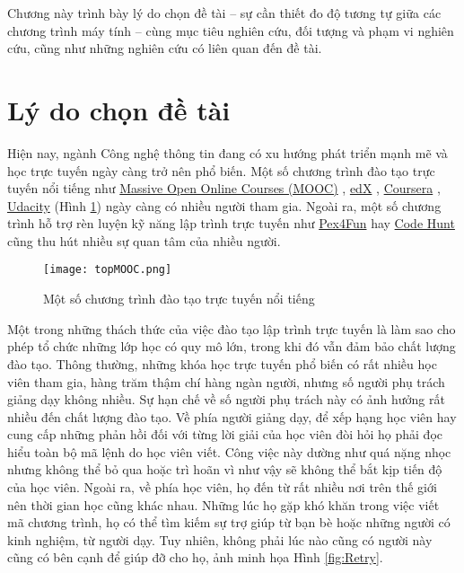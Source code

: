 Chương này trình bày lý do chọn đề tài -- sự cần thiết đo độ tương tự
giữa các chương trình máy tính -- cùng mục tiêu nghiên cứu, đối tượng và phạm
vi nghiên cứu, cũng như những nghiên cứu có liên quan đến đề tài.

\section{Lý do chọn đề tài}

Hiện nay, ngành Công nghệ thông tin đang có xu hướng phát triển mạnh
mẽ và học trực tuyến ngày càng trở nên phổ biến. Một số chương trình
đào tạo trực tuyến nổi tiếng như
\href{https://www.coursera.org/course/saas}{Massive Open Online
  Courses (MOOC)} \cite{mooc}, \href{https://www.edx.org/}{edX}
\cite{edx}, \href{https://www.coursera.org/}{Coursera}
\cite{coursera}, \href{http://www.udacity.com/}{Udacity}
\cite{Udacity} (Hình \ref{fig:progarming-online}) ngày càng có nhiều người tham gia. Ngoài ra, một số
chương trình hỗ trợ rèn luyện kỹ năng lập trình trực tuyến như
\href{https://www.pexforfun.com/}{Pex4Fun} \cite{Pex4Fun} hay
\href{https://www.microsoft.com/en-us/research/project/code-hunt/}{Code
  Hunt} \cite{CodeHunt} cũng thu hút nhiều sự quan tâm của nhiều
người. 

\begin{figure}[h]
	\centering
	\texttt{[image: topMOOC.png]}
	\caption{Một số chương trình đào tạo trực tuyến nổi tiếng}
	\label{fig:progarming-online}		
\end{figure}

Một trong những thách thức của việc đào tạo lập trình trực tuyến là
làm sao cho phép tổ chức những lớp học có quy mô lớn, trong khi đó vẫn
đảm bảo chất lượng đào tạo. Thông thường, những khóa học trực tuyến
phổ biến có rất nhiều học viên tham gia, hàng trăm thậm chí hàng ngàn
người, nhưng số người phụ trách giảng dạy không nhiều. Sự hạn chế về
số người phụ trách này có ảnh hưởng rất nhiều đến chất lượng đào
tạo. Về phía người giảng dạy, để xếp hạng học viên hay cung cấp những
phản hồi đối với từng lời giải của học viên đòi hỏi họ phải đọc hiểu
toàn bộ mã lệnh do học viên viết. Công việc này dường như quá nặng
nhọc nhưng không thể bỏ qua hoặc trì hoãn vì như vậy sẽ không thể bắt
kịp tiến độ của học viên. Ngoài ra, về phía học viên, họ đến từ rất
nhiều nơi trên thế giới nên thời gian học cũng khác nhau. Những lúc họ
gặp khó khăn trong việc viết mã chương trình, họ có thể tìm kiếm sự
trợ giúp từ bạn bè hoặc những người có kinh nghiệm, từ người dạy. Tuy
nhiên, không phải lúc nào cũng có người này cũng có bên cạnh để giúp
đỡ cho họ, ảnh minh họa Hình \ref{fig:Retry}. 

